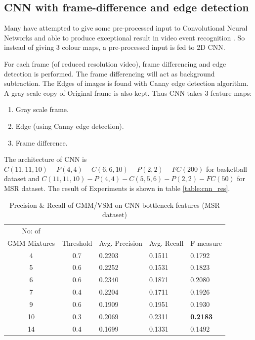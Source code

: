 \subsection{CNN with frame-difference and edge detection}

Many have attempted to give some pre-processed input to Convolutional Neural Networks and able to produce exceptional result in video event recognition \citep{ji20133d}. So instead of giving 3 colour maps, a pre-processed input is fed to 2D CNN.

For each frame (of reduced resolution video), frame differencing and edge detection is performed. The frame differencing will act as background subtraction. The Edges of images is found with Canny edge detection algorithm. A gray scale copy of Original frame is also kept. Thus CNN takes 3 feature maps:
\begin{enumerate}
\item Gray scale frame.
\item Edge (using Canny edge detection).
\item Frame difference.
\end{enumerate}

The architecture of CNN is $C(11, 11, 10)-P(4, 4)-C(6, 6, 10)-P(2, 2)-FC(200)$ for basketball dataset and $C(11, 11, 10)-P(4,4)-C(5, 5, 6)-P(2,2)-FC(50)$ for MSR dataset. The result of Experiments is shown in table \ref{table:cnn_res}.

\begin{table}[h]
\centering
\begin{tabular}{|c|c|l|l|l|}
\hline
No: of &&&&\\
GMM Mixtures & Threshold & Avg. Precision & Avg. Recall & F-measure\\
\hline
\hline
 4 	&0.7 	&0.2203 	& 0.1511	&0.1792\\
 5 	&0.6 	&0.2252 	& 0.1531	&0.1823\\
 6 	&0.6 	&0.2340 	& 0.1871	&0.2080\\
 7 	&0.4 	&0.2204 	& 0.1711	&0.1926\\
 9 	&0.6 	&0.1909 	& 0.1951	&0.1930\\
10 	&0.3 	&0.2069 	& 0.2311	&\textbf{0.2183}\\
14 	&0.4 	&0.1699 	& 0.1331	&0.1492\\
\hline  
\end{tabular}
\caption[Event spotting using GMM/VSM on CNN(Gray,Frame diff,Edge) bottleneck features (MSR Action Dataset) ]{ Precision \& Recall  of GMM/VSM on CNN bottleneck features (MSR dataset)}
\label{table:cnn_gmm_res_msr}
\end{table} 

